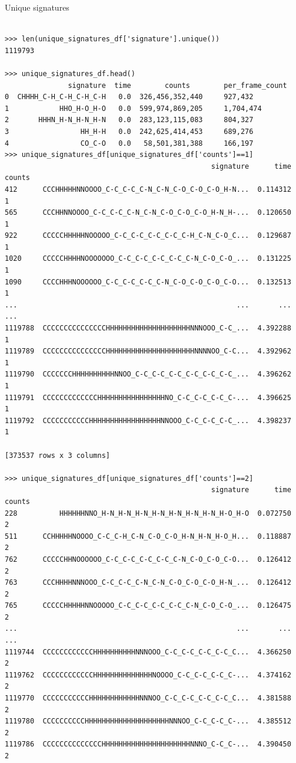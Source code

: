 Unique signatures
\begin{verbatim}
    
>>> len(unique_signatures_df['signature'].unique())
1119793

>>> unique_signatures_df.head()
               signature  time        counts        per_frame_count
0  CHHHH_C-H_C-H_C-H_C-H   0.0  326,456,352,440     927,432
1            HHO_H-O_H-O   0.0  599,974,869,205     1,704,474
2       HHHN_H-N_H-N_H-N   0.0  283,123,115,083     804,327
3                 HH_H-H   0.0  242,625,414,453     689,276
4                 CO_C-O   0.0   58,501,381,388     166,197
>>> unique_signatures_df[unique_signatures_df['counts']==1]
                                                 signature      time  counts
412      CCCHHHHHNNOOOO_C-C_C-C_C-N_C-N_C-O_C-O_C-O_H-N...  0.114312       1
565      CCCHHNNOOOO_C-C_C-C_C-N_C-N_C-O_C-O_C-O_H-N_H-...  0.120650       1
922      CCCCCHHHHHNOOOOO_C-C_C-C_C-C_C-C_C-H_C-N_C-O_C...  0.129687       1
1020     CCCCCHHHHNOOOOOOO_C-C_C-C_C-C_C-C_C-N_C-O_C-O_...  0.131225       1
1090     CCCCHHHNOOOOOO_C-C_C-C_C-C_C-N_C-O_C-O_C-O_C-O...  0.132513       1
...                                                    ...       ...     ...
1119788  CCCCCCCCCCCCCCCHHHHHHHHHHHHHHHHHHHHNNNOOO_C-C_...  4.392288       1
1119789  CCCCCCCCCCCCCCCHHHHHHHHHHHHHHHHHHHHHNNNNOO_C-C...  4.392962       1
1119790  CCCCCCCHHHHHHHHHHNNOO_C-C_C-C_C-C_C-C_C-C_C-C_...  4.396262       1
1119791  CCCCCCCCCCCCCHHHHHHHHHHHHHHHHNO_C-C_C-C_C-C_C-...  4.396625       1
1119792  CCCCCCCCCCCHHHHHHHHHHHHHHHHHNNOOO_C-C_C-C_C-C_...  4.398237       1

[373537 rows x 3 columns]

>>> unique_signatures_df[unique_signatures_df['counts']==2]
                                                 signature      time  counts
228          HHHHHHNNO_H-N_H-N_H-N_H-N_H-N_H-N_H-N_H-O_H-O  0.072750       2
511      CCHHHHHNOOOO_C-C_C-H_C-N_C-O_C-O_H-N_H-N_H-O_H...  0.118887       2
762      CCCCCHHNOOOOOO_C-C_C-C_C-C_C-C_C-N_C-O_C-O_C-O...  0.126412       2
763      CCCHHHHNNNOOO_C-C_C-C_C-N_C-N_C-O_C-O_C-O_H-N_...  0.126412       2
765      CCCCCHHHHHNNOOOOO_C-C_C-C_C-C_C-C_C-N_C-O_C-O_...  0.126475       2
...                                                    ...       ...     ...
1119744  CCCCCCCCCCCCHHHHHHHHHHNNNOOO_C-C_C-C_C-C_C-C_C...  4.366250       2
1119762  CCCCCCCCCCCCHHHHHHHHHHHHHHNOOOO_C-C_C-C_C-C_C-...  4.374162       2
1119770  CCCCCCCCCCCHHHHHHHHHHHHNNNOO_C-C_C-C_C-C_C-C_C...  4.381588       2
1119780  CCCCCCCCCCHHHHHHHHHHHHHHHHHHHHNNNOO_C-C_C-C_C-...  4.385512       2
1119786  CCCCCCCCCCCCCCHHHHHHHHHHHHHHHHHHHHHNNNO_C-C_C-...  4.390450       2


\end{verbatim}
